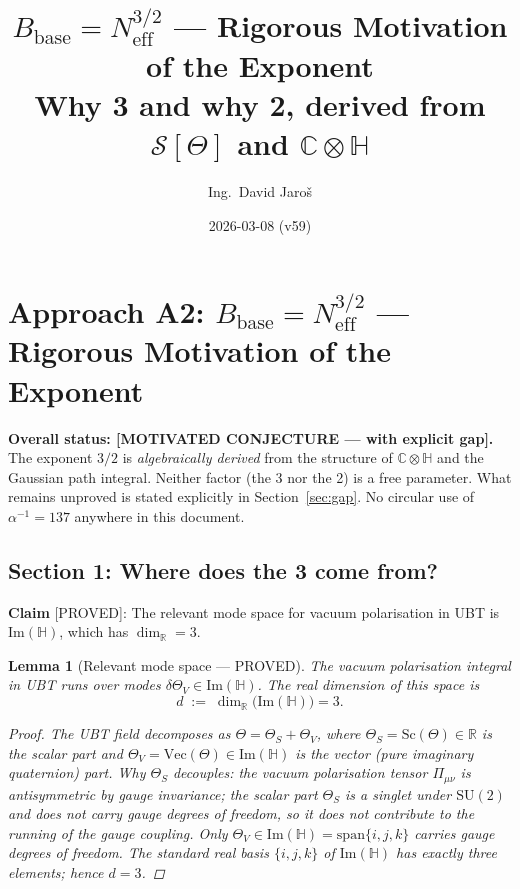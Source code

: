 \documentclass[11pt,a4paper]{article}
\title{$B_{\mathrm{base}} = N_{\mathrm{eff}}^{3/2}$ — Rigorous Motivation of the Exponent\\
    \large Why 3 and why 2, derived from $\mathcal{S}[\Theta]$ and $\mathbb{C}\otimes\mathbb{H}$}
\author{Ing.\ David Jaroš}
\date{2026-03-08 (v59)}
\newtheorem{lemma}{Lemma}
\theoremstyle{definition}
\theoremstyle{remark}
\begin{document}
  \maketitle
\fi

\section{Approach A2: \texorpdfstring{$B_{\mathrm{base}} = N_{\mathrm{eff}}^{3/2}$}{B\_base = N\_eff\^{}3/2} — Rigorous Motivation of the Exponent}
\label{sec:hausdorff_approach}

\textbf{Overall status: [MOTIVATED CONJECTURE — with explicit gap].}
The exponent $3/2$ is \emph{algebraically derived} from the structure of
$\mathbb{C}\otimes\mathbb{H}$ and the Gaussian path integral.
Neither factor (the 3 nor the 2) is a free parameter.
What remains unproved is stated explicitly in Section~\ref{sec:gap}.
No circular use of $\alpha^{-1} = 137$ anywhere in this document.

\subsection{Section 1: Where does the 3 come from?}
\label{sec:three}

\textbf{Claim} [PROVED]: The relevant mode space for vacuum polarisation in UBT
is $\mathrm{Im}(\mathbb{H})$, which has $\dim_\mathbb{R} = 3$.

\begin{lemma}[Relevant mode space — PROVED]
\label{lem:mode_space}
  The vacuum polarisation integral in UBT runs over modes
  $\delta\Theta_V \in \mathrm{Im}(\mathbb{H})$.
  The real dimension of this space is
  \begin{equation}
    d \;:=\; \dim_{\mathbb{R}}\bigl(\mathrm{Im}(\mathbb{H})\bigr) = 3.
    \label{eq:dim_ImH}
  \end{equation}
  \begin{proof}
    The UBT field decomposes as $\Theta = \Theta_S + \Theta_V$, where
    $\Theta_S = \mathrm{Sc}(\Theta) \in \mathbb{R}$ is the scalar part and
    $\Theta_V = \mathrm{Vec}(\Theta) \in \mathrm{Im}(\mathbb{H})$ is the
    vector (pure imaginary quaternion) part.
    \textit{Why $\Theta_S$ decouples:} the vacuum polarisation tensor
    $\Pi_{\mu\nu}$ is antisymmetric by gauge invariance; the scalar part
    $\Theta_S$ is a singlet under $\mathrm{SU}(2)$ and does not carry
    gauge degrees of freedom, so it does not contribute to the running of
    the gauge coupling.
    Only $\Theta_V \in \mathrm{Im}(\mathbb{H}) = \mathrm{span}\{i,j,k\}$
    carries gauge degrees of freedom.
    The standard real basis $\{i, j, k\}$ of $\mathrm{Im}(\mathbb{H})$
    has exactly three elements; hence $d = 3$.
  \end{proof}
\end{lemma}
\end{document}

